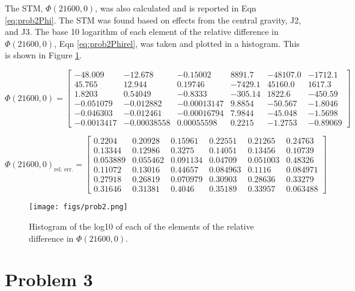 \documentclass[11pt]{article}
\begin{document}
The STM, $\Phi(21600,0)$, was also calculated and is reported in Eqn \eqref{eq:prob2Phi}. The STM was found based on effects from the central gravity, J2, and J3. The base 10 logarithm of each element of the relative difference in $\Phi(21600,0)$, Eqn \eqref{eq:prob2Phirel}, was taken and plotted in a histogram. This is shown in Figure \ref{fig:prob2Phi}.

\begin{equation}
\label{eq:prob2Phi}
\Phi(21600,0) = \left[\begin{array}{cccccc} -48.009 & -12.678 & -0.15002 & 8891.7 & -48107.0 & -1712.1\\ 45.765 & 12.944 & 0.19746 & -7429.1 & 45160.0 & 1617.3\\ 1.8203 & 0.54049 & -0.8333 & -305.14 & 1822.6 & -450.59\\ -0.051079 & -0.012882 & -0.00013147 & 9.8854 & -50.567 & -1.8046\\ -0.046303 & -0.012461 & -0.00016794 & 7.9844 & -45.048 & -1.5698\\ -0.0013417 & -0.00038558 & 0.00055598 & 0.2215 & -1.2753 & -0.89069 \end{array}\right]
\end{equation}

\begin{equation}
\label{eq:prob2Phirel}
\Phi(21600,0)_{\text{rel. err.}} = \left[\begin{array}{cccccc} 0.2204 & 0.20928 & 0.15961 & 0.22551 & 0.21265 & 0.24763\\ 0.13344 & 0.12986 & 0.3275 & 0.14051 & 0.13456 & 0.10739\\ 0.053889 & 0.055462 & 0.091134 & 0.04709 & 0.051003 & 0.48326\\ 0.11072 & 0.13016 & 0.44657 & 0.084963 & 0.1116 & 0.084971\\ 0.27918 & 0.26819 & 0.070979 & 0.30903 & 0.28636 & 0.33279\\ 0.31646 & 0.31381 & 0.4046 & 0.35189 & 0.33957 & 0.063488 \end{array}\right]
\end{equation}

\begin{figure}[!htb]
	\centering
	\texttt{[image: figs/prob2.png]}
	\caption{Histogram of the log10 of each of the elements of the relative difference in $\Phi(21600,0)$.}
	\label{fig:prob2Phi}
\end{figure}

\section{Problem 3}
\end{document}
